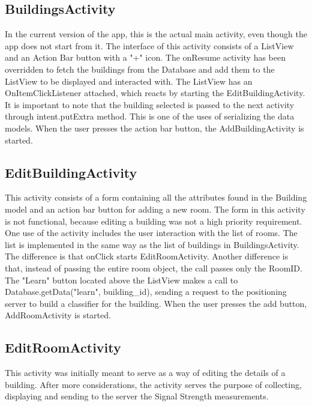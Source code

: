 \subsection{BuildingsActivity}
In the current version of the app, this is the actual main activity, even though the app does not start from it.
The interface of this activity consists of a ListView and an Action Bar button with a "+" icon. 
The onResume activity has been overridden to fetch the buildings from the Database and add them to the ListView to be displayed and interacted with. The ListView has an OnItemClickListener attached, which reacts by starting the EditBuildingActivity. It is important to note that the building selected is passed to the next activity through intent.putExtra method. This is one of the uses of serializing the data models. When the user presses the action bar button, the AddBuildingActivity is started.

\subsection{EditBuildingActivity}
This activity consists of a form containing all the attributes found in the Building model and an action bar button for adding a new room. The form in this activity is not functional, because editing a building was not a high priority requirement. 
One use of the activity includes the user interaction with the list of rooms. The list is implemented in the same way as the list of buildings in BuildingsActivity. The difference is that onClick starts EditRoomActivity. Another difference is that, instead of passing the entire room object, the call passes only the RoomID.
The "Learn" button located above the ListView makes a call to Database.getData("learn", building\_id), sending a request to the positioning server to build a classifier for the building.
When the user presses the add button, AddRoomActivity is started.

\subsection{EditRoomActivity}
This activity was initially meant to serve as a way of editing the details of a building. After more considerations, the activity serves the purpose of collecting, displaying and sending to the server the Signal Strength measurements. 

